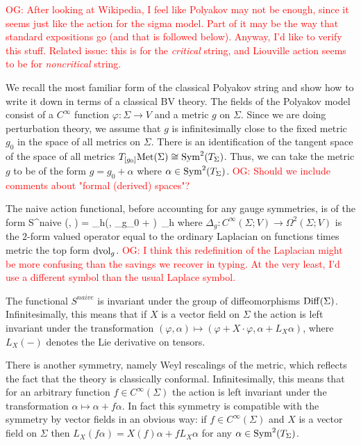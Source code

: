 \documentclass[10pt]{amsart}
\def\owen{\textcolor{red}{OG: }\textcolor{red}}
\begin{document}
\owen{After looking at Wikipedia, I feel like Polyakov may not be enough, since it seems just like the action for the sigma model. Part of it may be the way that standard expositions go (and that is followed below). Anyway, I'd like to verify this stuff. Related issue: this is for the {\em critical} string, and Liouville action seems to be for {\em noncritical} string.}

We recall the most familiar form of the classical Polyakov string and show how to write it down in terms of a classical BV theory. The fields of the Polyakov model consist of a $C^\infty$ function $\varphi : \Sigma \to V$ and a metric $g$ on $\Sigma$. Since we are doing perturbation theory, we assume that $g$ is infinitesimally close to the fixed metric $g_0$ in the space of all metrics on $\Sigma$. There is an identification of the tangent space of the space of all metrics $T_{[g_0]} {\rm Met}(\Sigma) \cong {\rm Sym}^2(T_\Sigma)$. Thus, we can take the metric $g$ to be of the form $g = g_0 + \alpha$ where $\alpha \in {\rm Sym}^2(T_\Sigma)$. \owen{Should we include comments about "formal (derived) spaces"?}
 
The naive action functional, before accounting for any gauge symmetries, is of the form
\ben
S^{naive} (\varphi, \alpha) = \int_\Sigma h(\varphi, \Delta_{g_0 + \alpha} \varphi)\, \dvol_h
\een
where $\Delta_g : C^\infty(\Sigma ; V) \to \Omega^2(\Sigma ; V)$ is the $2$-form valued operator equal to the ordinary Laplacian on functions times metric the top form ${\rm dvol}_g$. \owen{I think this redefinition of the Laplacian might be more confusing than the savings we recover in typing. At the very least, I'd use a different symbol than the usual Laplace symbol.}

The functional $S^{naive}$ is invariant under the group of diffeomorphisms ${\rm Diff}(\Sigma)$. Infinitesimally, this means that if $X$ is a vector field on $\Sigma$ the action is left invariant under the transformation $(\varphi,\alpha) \mapsto (\varphi + X \cdot \varphi, \alpha + L_X \alpha)$, where $L_X(-)$ denotes the Lie derivative on tensors. 

There is another symmetry, namely Weyl rescalings of the metric, which reflects the fact that the theory is classically conformal. Infinitesimally, this means that for an arbitrary function $f \in C^\infty(\Sigma)$ the action is left invariant under the transformation $\alpha \mapsto \alpha + f \alpha$. In fact this symmetry is compatible with the symmetry by vector fields in an obvious way: if $f \in C^\infty(\Sigma)$ and $X$ is a vector field on $\Sigma$ then $L_{X} (f \alpha) = X(f) \alpha + f L_X \alpha$ for any $\alpha \in {\rm Sym}^2(T_\Sigma)$. 
\end{document}
